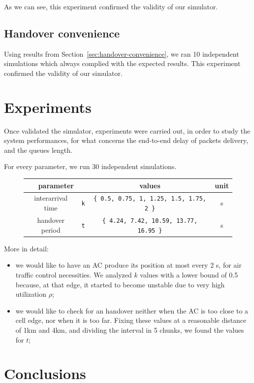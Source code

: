 \documentclass[a4paper,12pt]{article}
\begin{document}
As we can see, this experiment confirmed the validity of our simulator.

\subsection{Handover convenience}
Using results from Section~\ref{sec:handover-convenience}, we ran 10 independent simulations which always complied with the expected results.
This experiment confirmed the validity of our simulator.

\section{Experiments}
Once validated the simulator, experiments were carried out, in order to study the system performances, for what concerns the end-to-end delay of packets delivery, and the queues length.

For every parameter, we run 30 independent simulations.

\begin{figure}[H]
  \centering
  \begin{tabular}{| c | c | c | c |}\hline
    \multicolumn{2}{|c|}{parameter} & values & unit \\ \hline
    interarrival time & \texttt{k} & \texttt{\{ 0.5, 0.75, 1, 1.25, 1.5, 1.75, 2 \}} & s \\ \hline
    handover period & \texttt{t} & \texttt{\{ 4.24, 7.42, 10.59, 13.77, 16.95 \}} & s \\ \hline
  \end{tabular}
\end{figure}

More in detail:
\begin{itemize}
  \item we would like to have an AC produce its position at most every 2 s, for air traffic control necessities.
  We analyzed $k$ values with a lower bound of 0.5 because, at that edge, it started to become unstable due to very high utilization $\rho$;
  \item we would like to check for an handover neither when the AC is too close to a cell edge, nor when it is too far.
  Fixing these values at a reasonable distance of 1km and 4km, and dividing the interval in 5 chunks, we found the values for $t$;
\end{itemize}

\section{Conclusions}
\end{document}
